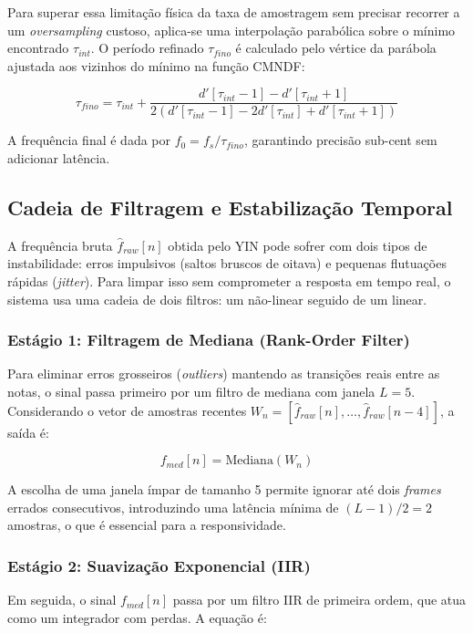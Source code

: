 \documentclass[11pt, a4paper]{article}
\theoremstyle{plain}
\theoremstyle{definition}
\begin{document}
Para superar essa limitação física da taxa de amostragem sem precisar recorrer a um \textit{oversampling} custoso, aplica-se uma interpolação parabólica sobre o mínimo encontrado $\tau_{int}$. O período refinado $\tau_{fino}$ é calculado pelo vértice da parábola ajustada aos vizinhos do mínimo na função CMNDF:

\begin{equation}
    \tau_{fino} = \tau_{int} + \frac{d'[\tau_{int}-1] - d'[\tau_{int}+1]}{2(d'[\tau_{int}-1] - 2d'[\tau_{int}] + d'[\tau_{int}+1])}
\end{equation}

A frequência final é dada por $f_0 = f_s / \tau_{fino}$, garantindo precisão sub-cent sem adicionar latência.

\subsection{Cadeia de Filtragem e Estabilização Temporal}

A frequência bruta $\hat{f}_{raw}[n]$ obtida pelo YIN pode sofrer com dois tipos de instabilidade: erros impulsivos (saltos bruscos de oitava) e pequenas flutuações rápidas (\textit{jitter}). Para limpar isso sem comprometer a resposta em tempo real, o sistema usa uma cadeia de dois filtros: um não-linear seguido de um linear.

\subsubsection{Estágio 1: Filtragem de Mediana (Rank-Order Filter)}
Para eliminar erros grosseiros (\textit{outliers}) mantendo as transições reais entre as notas, o sinal passa primeiro por um filtro de mediana com janela $L=5$. Considerando o vetor de amostras recentes $W_n = [\hat{f}_{raw}[n], \dots, \hat{f}_{raw}[n-4]]$, a saída é:

\begin{equation}
    f_{med}[n] = \text{Mediana}(W_n)
\end{equation}

A escolha de uma janela ímpar de tamanho 5 permite ignorar até dois \textit{frames} errados consecutivos, introduzindo uma latência mínima de $(L-1)/2 = 2$ amostras, o que é essencial para a responsividade.

\subsubsection{Estágio 2: Suavização Exponencial (IIR)}
Em seguida, o sinal $f_{med}[n]$ passa por um filtro IIR de primeira ordem, que atua como um integrador com perdas. A equação é:
\end{document}
